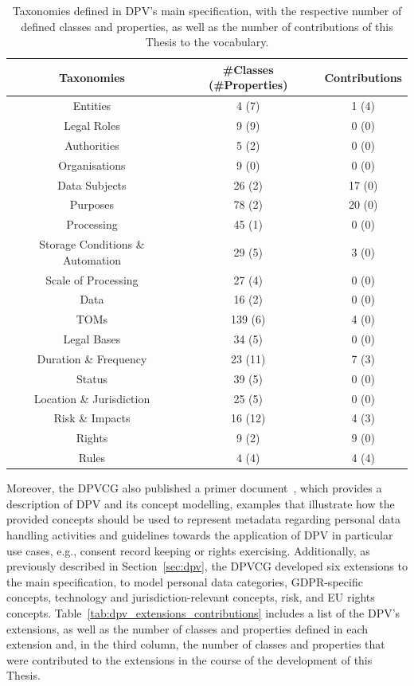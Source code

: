 \begin{table}[htbp]
\centering
\caption[Taxonomies defined in DPV's main specification.]{Taxonomies defined in DPV's main specification, with the respective number of defined classes and properties, as well as the number of contributions of this Thesis to the vocabulary.}
\label{tab:dpv_main_contributions} 
\begin{tabular}{ c||c|c}
 Taxonomies & \#Classes (\#Properties)  & Contributions \\
 \hline\hline
 Entities & 4 (7) & 1 (4) \\
 \hline
 Legal Roles & 9 (9) & 0 (0) \\
 \hline
 Authorities & 5 (2) & 0 (0) \\
 \hline
 Organisations & 9 (0) & 0 (0) \\
 \hline
 Data Subjects & 26 (2) & 17 (0) \\
 \hline
 Purposes & 78 (2) & 20 (0) \\
 \hline
 Processing & 45 (1) & 0 (0) \\
 \hline
 Storage Conditions \& Automation & 29 (5) & 3 (0) \\
 \hline
 Scale of Processing & 27 (4) & 0 (0) \\
 \hline
 Data & 16 (2) & 0 (0) \\
 \hline
 TOMs & 139 (6) & 4 (0) \\
 \hline
 Legal Bases & 34 (5) & 0 (0) \\
 \hline
 Duration \& Frequency & 23 (11) & 7 (3) \\
 \hline
 Status & 39 (5) & 0 (0) \\
 \hline
 Location \& Jurisdiction & 25 (5) & 0 (0) \\
 \hline
 Risk \& Impacts & 16 (12) & 4 (3) \\
 \hline
 Rights & 9 (2) & 9 (0) \\
 \hline
 Rules & 4 (4) & 4 (4) \\
\end{tabular}
\end{table}

Moreover, the DPVCG also published a primer document~\citep{pandit_primer_2022}, which provides a description of DPV and its concept modelling, examples that illustrate how the provided concepts should be used to represent metadata regarding personal data handling activities and guidelines towards the application of DPV in particular use cases, e.g., consent record keeping or rights exercising.
Additionally, as previously described in Section~\ref{sec:dpv}, the DPVCG developed six extensions to the main specification, to model personal data categories, GDPR-specific concepts, technology and jurisdiction-relevant concepts, risk, and EU rights concepts.
Table~\ref{tab:dpv_extensions_contributions} includes a list of the DPV's extensions, as well as the number of classes and properties defined in each extension and, in the third column, the number of classes and properties that were contributed to the extensions in the course of the development of this Thesis.

